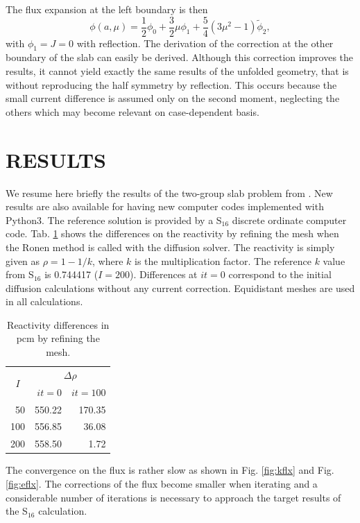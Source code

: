 \documentclass{ictt26}
\begin{document}
The flux expansion at the left boundary is then
\[ \phi(a, \mu) = \frac{1}{2} \phi_0 + \frac{3}{2} \mu \phi_1 + \frac{5}{4} \left( 3 \mu^2 - 1 \right) \tilde{\phi}_2, \]
with $\phi_1 = J = 0$ with reflection. The derivation of the correction at the other boundary of the slab can easily be derived. Although this correction improves the results, it cannot yield exactly the same results of the unfolded geometry, that is without reproducing the half symmetry by reflection. This occurs because the small current difference is assumed only on the second moment, neglecting the others which may become relevant on case-dependent basis.


\section{RESULTS}
\label{sec:res}

We resume here briefly the results of the two-group slab problem from \cite{tomatis2011application}. New results are also available for having new computer codes implemented with Python3. The reference solution is provided by a S$_{16}$ discrete ordinate computer code. Tab. \ref{tab:kconv} shows the differences on the reactivity by refining the mesh when the Ronen method is called with the diffusion solver. The reactivity is simply given as $\rho = 1 - 1/k$, where $k$ is the multiplication factor. The reference $k$ value from S$_{16}$ is 0.744417 ($I = 200$). Differences at $it=0$ correspond to the initial diffusion calculations without any current correction. Equidistant meshes are used in all calculations.
%
\begin{table}[htbp]
\centering
\caption{Reactivity differences in pcm by refining the mesh.\label{tab:kconv}}
\begin{tabular}{c|r|r}
\multirow{2}{*}{$I$} & \multicolumn{2}{|c}{$\Delta \rho$} \\ \cline{2-3}
     & $it=0$ & $it=100$ \\ \hline
 ~50 & 550.22 & 170.35 \\
 100 & 556.85 & ~36.08 \\
 200 & 558.50 & ~~1.72
\end{tabular}
\end{table}

The convergence on the flux is rather slow as shown in Fig. \ref{fig:kflx} and Fig. \ref{fig:eflx}. The corrections of the flux become smaller when iterating and a considerable number of iterations is necessary to approach the target results of the S$_{16}$ calculation.
\end{document}
